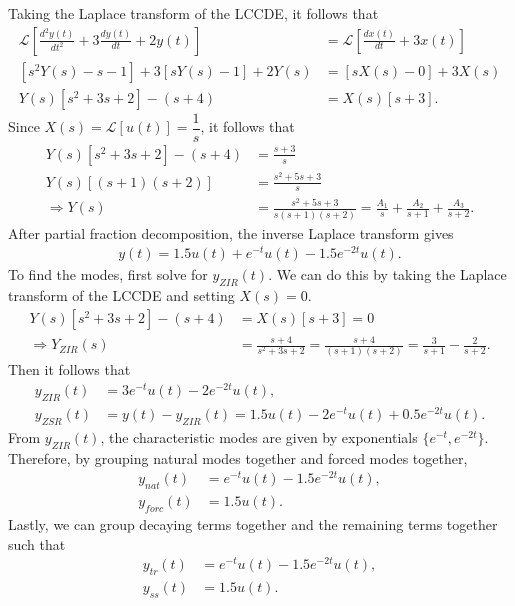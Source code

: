 \documentclass{report}
\begin{document}
\begin{solution}
    Taking the Laplace transform of the LCCDE, it follows that 
    \begin{align*}
        \mathcal{L}\left[\frac{d^2y(t)}{dt^2} + 3\frac{dy(t)}{dt} + 2y(t)\right] &= \mathcal{L}\left[\frac{dx(t)}{dt} + 3x(t)\right] \\
        [s^2Y(s)-s-1] + 3[sY(s)-1] + 2Y(s) &= [sX(s)-0] + 3X(s) \\
        Y(s)[s^2+3s+2] - (s+4) &= X(s)[s+3].
    \end{align*}
    Since $X(s) = \mathcal{L}[u(t)] = \dfrac{1}{s}$, it follows that
    \begin{align*}
        Y(s)[s^2+3s+2] - (s+4) &= \frac{s+3}{s} \\
        Y(s)[(s+1)(s+2)] &= \frac{s^2+5s+3}{s} \\
        \Longrightarrow Y(s) &= \frac{s^2+5s+3}{s(s+1)(s+2)} = \frac{A_1}{s} + \frac{A_2}{s+1} + \frac{A_3}{s+2}.
    \end{align*}
    After partial fraction decomposition, the inverse Laplace transform gives 
    \begin{align*}
        y(t) = 1.5u(t) + e^{-t}u(t) -1.5e^{-2t}u(t).
    \end{align*}
    To find the modes, first solve for $y_{ZIR}(t)$. We can do this by taking the Laplace transform of the LCCDE and setting $X(s)=0$.
    \begin{align*}
        Y(s)[s^2+3s+2] - (s+4) &= X(s)[s+3] = 0 \\
        \Longrightarrow Y_{ZIR}(s) &= \frac{s+4}{s^2+3s+2} = \frac{s+4}{(s+1)(s+2)} = \frac{3}{s+1} - \frac{2}{s+2}.
    \end{align*}
    Then it follows that 
    \begin{align*}
        y_{ZIR}(t) &= 3e^{-t}u(t) - 2e^{-2t}u(t), \\
        y_{ZSR}(t) &= y(t) - y_{ZIR}(t) = 1.5u(t) - 2e^{-t}u(t) + 0.5e^{-2t}u(t).
    \end{align*}
    From $y_{ZIR}(t)$, the characteristic modes are given by exponentials $\{e^{-t}, e^{-2t}\}$. Therefore, by grouping natural modes together and forced modes together, 
    \begin{align*}
        y_{nat}(t) &= e^{-t}u(t) - 1.5e^{-2t}u(t), \\
        y_{forc}(t) &= 1.5u(t).
    \end{align*}
    Lastly, we can group decaying terms together and the remaining terms together such that 
    \begin{align*}
        y_{tr}(t) &= e^{-t}u(t) - 1.5e^{-2t}u(t), \\
        y_{ss}(t) &= 1.5u(t).
    \end{align*}
\end{solution}
\end{document}
